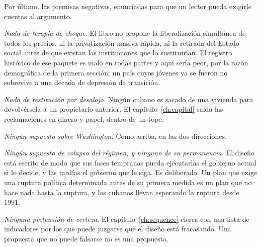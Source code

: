 Por último, las premisas negativas, enunciadas para que un lector pueda exigirle
cuentas al argumento.

\emph{Nada de terapia de choque.} El libro no propone la liberalización simultánea
de todos los precios, ni la privatización masiva rápida, ni la retirada del Estado
social antes de que existan las instituciones que lo sustituirían. El registro
histórico de ese paquete es malo en todas partes y aquí sería peor, por la razón
demográfica de la primera sección: un país cuyos jóvenes ya se fueron no sobrevive
a una década de depresión de transición.

\emph{Nada de restitución por desalojo.} Ningún cubano es sacado de una vivienda
para devolvérsela a un propietario anterior. El capítulo~\ref{ch:capital} salda las
reclamaciones en dinero y papel, dentro de un tope.

\emph{Ningún supuesto sobre Washington.} Como arriba, en las dos direcciones.

\emph{Ningún supuesto de colapso del régimen, y ninguno de su permanencia.} El
diseño está escrito de modo que sus fases tempranas pueda ejecutarlas el gobierno
actual si lo decide, y las tardías el gobierno que le siga. Es deliberado. Un plan
que exige una ruptura política determinada antes de su primera medida es un plan
que no hace nada hasta la ruptura, y los cubanos llevan esperando la ruptura desde
1991.

\emph{Ninguna pretensión de certeza.} El capítulo~\ref{ch:sequence} cierra con una
lista de indicadores por los que puede juzgarse que el diseño está fracasando. Una
propuesta que no puede falsarse no es una propuesta.
